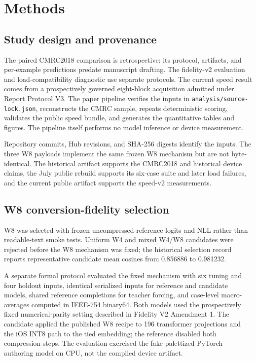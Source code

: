 \documentclass[10pt]{article}
\DeclareRobustCommand{\evidence}[1]{}
\DeclareRobustCommand{\artifact}[1]{\nolinkurl{#1}}
\begin{document}
\section{Methods}

\subsection{Study design and provenance}

The paired CMRC2018 comparison is retrospective: its protocol, artifacts, and per-example predictions predate manuscript drafting. The fidelity-v2 evaluation and load-compatibility diagnostic use separate protocols. The current speed result comes from a prospectively governed eight-block acquisition admitted under Report Protocol V3.\evidence{CL-07,CL-28} The paper pipeline verifies the inputs in \artifact{analysis/source-lock.json}, reconstructs the CMRC sample, repeats deterministic scoring, validates the public speed bundle, and generates the quantitative tables and figures. The pipeline itself performs no model inference or device measurement.

Repository commits, Hub revisions, and SHA-256 digests identify the inputs. The three W8 payloads implement the same frozen W8 mechanism but are not byte-identical. The historical artifact supports the CMRC2018 and historical device claims, the July public rebuild supports its six-case suite and later load failures, and the current public artifact supports the speed-v2 measurements.\evidence{CL-22}

\subsection{W8 conversion-fidelity selection}

W8 was selected with frozen uncompressed-reference logits and NLL rather than readable-text smoke tests. Uniform W4 and mixed W4/W8 candidates were rejected before the W8 mechanism was fixed; the historical selection record reports representative candidate mean cosines from 0.856886 to 0.981232.\evidence{CL-06}

A separate formal protocol evaluated the fixed mechanism with six tuning and four holdout inputs, identical serialized inputs for reference and candidate models, shared reference completions for teacher forcing, and case-level macro-averages computed in IEEE-754 binary64. Both models used the prospectively fixed numerical-parity setting described in Fidelity V2 Amendment 1. The candidate applied the published W8 recipe to 196 transformer projections and the iOS INT8 path to the tied embedding; the reference disabled both compression steps. The evaluation exercised the fake-palettized PyTorch authoring model on CPU, not the compiled device artifact.\evidence{CL-07}
\end{document}
